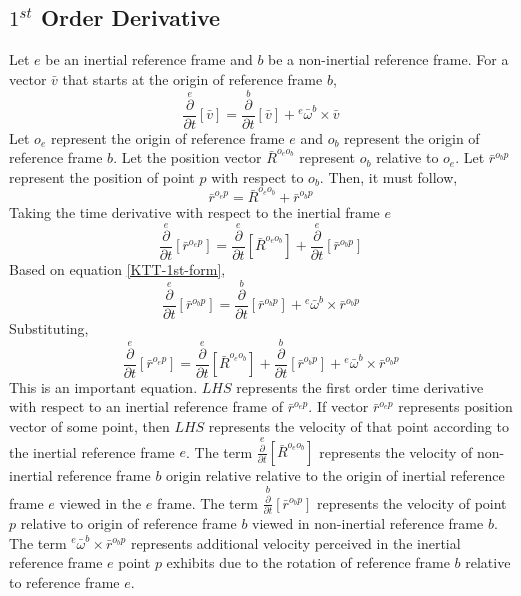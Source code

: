 \documentclass[a4paper, 12pt]{report}
\begin{document}
\begin{center}
\section{$1^{st}$ Order Derivative}
\begin{comment}
\end{comment}
Let $e$ be an inertial reference frame and  $b$ be a non-inertial reference frame. For a vector $\bar{v}$ that starts at the origin of reference frame $b$,
\begin{equation}
\overset{e}{\frac{\partial}{\partial t}}[\bar{v}] = \overset{b}{\frac{\partial}{\partial t}}[\bar{v}] + {}^{e}\bar{\omega}^{b}\times\bar{v}\label{KTT-1st-form}
\end{equation}
Let $o_{e}$ represent the origin of reference frame $e$ and $o_{b}$ represent the origin of reference frame $b$. Let the position vector $\bar{R}^{o_{e}o_{b}}$ represent $o_{b}$ relative to $o_{e}$. Let $\bar{r}^{o_{b}p}$ represent the position of point $p$ with respect to $o_{b}$. Then, it must follow,
$$\bar{r}^{o_{e}p} = \bar{R}^{o_{e}o_{b}} + \bar{r}^{o_{b}p}$$
Taking the time derivative with respect to the inertial frame $e$
$$\overset{e}{\frac{\partial}{\partial t}}[\bar{r}^{o_{e}p}] = \overset{e}{\frac{\partial}{\partial t}}[\bar{R}^{o_{e}o_{b}}] + \overset{e}{\frac{\partial}{\partial t}}[\bar{r}^{o_{b}p}]$$
Based on equation \ref{KTT-1st-form},
$$\overset{e}{\frac{\partial}{\partial t}}[\bar{r}^{o_{b}p}] = \overset{b}{\frac{\partial}{\partial t}}[\bar{r}^{o_{b}p}] + {}^{e}\bar{\omega}^{b}\times\bar{r}^{o_{b}p}$$
Substituting,
$$\overset{e}{\frac{\partial}{\partial t}}[\bar{r}^{o_{e}p}] = \overset{e}{\frac{\partial}{\partial t}}[\bar{R}^{o_{e}o_{b}}] + \overset{b}{\frac{\partial}{\partial t}}[\bar{r}^{o_{b}p}] + {}^{e}\bar{\omega}^{b}\times\bar{r}^{o_{b}p}$$
This is an important equation. $LHS$ represents the first order time derivative with respect to an inertial reference frame of $\displaystyle \bar{r}^{o_{e}p}$. If vector $\displaystyle \bar{r}^{o_{e}p}$ represents position vector of some point, then $LHS$ represents the velocity of that point according to the inertial reference frame $e$. The term $\displaystyle \overset{e}{\frac{\partial}{\partial t}}[\bar{R}^{o_{e}o_{b}}]$ represents the velocity of non-inertial reference frame $b$ origin relative relative to the origin of inertial reference frame $e$ viewed in the $e$ frame. The term $\displaystyle \overset{b}{\frac{\partial}{\partial t}}[\bar{r}^{o_{b}p}]$ represents the velocity of point $p$ relative to origin of reference frame $b$ viewed in non-inertial reference frame $b$. The term $\displaystyle {}^{e}\bar{\omega}^{b}\times\bar{r}^{o_{b}p}$ represents additional velocity perceived in the inertial reference frame $e$ point $p$ exhibits due to the rotation of reference frame $b$ relative to reference frame $e$.

\end{center}
\end{document}

